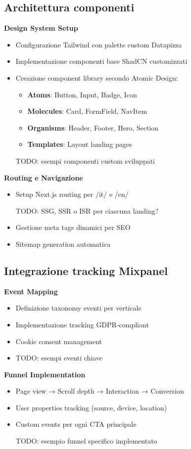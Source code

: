\subsection{Architettura componenti}
\textbf{Design System Setup}
\begin{itemize}
  \item Configurazione Tailwind con palette custom Datapizza
  \item Implementazione componenti base ShadCN customizzati
  \item Creazione component library secondo Atomic Design:
    \begin{itemize}
      \item \textbf{Atoms}: Button, Input, Badge, Icon
      \item \textbf{Molecules}: Card, FormField, NavItem
      \item \textbf{Organisms}: Header, Footer, Hero, Section
      \item \textbf{Templates}: Layout landing pages
    \end{itemize}
  \item [TODO: esempi componenti custom sviluppati]
\end{itemize}

\textbf{Routing e Navigazione}
\begin{itemize}
  \item Setup Next.js routing per /it/ e /en/
  \item [TODO: SSG, SSR o ISR per ciascuna landing?]
  \item Gestione meta tags dinamici per SEO
  \item Sitemap generation automatica
\end{itemize}

\subsection{Integrazione tracking Mixpanel}
\textbf{Event Mapping}
\begin{itemize}
  \item Definizione taxonomy eventi per verticale
  \item Implementazione tracking GDPR-compliant
  \item Cookie consent management
  \item TODO: esempi eventi chiave 
\end{itemize}

\textbf{Funnel Implementation}
\begin{itemize}
  \item Page view → Scroll depth → Interaction → Conversion
  \item User properties tracking (source, device, location)
  \item Custom events per ogni CTA principale
  \item [TODO: esempio funnel specifico implementato]
\end{itemize}

